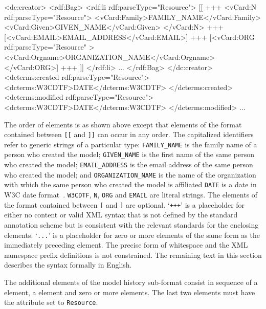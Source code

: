 \begin{blockChanged}

\begin{example}
<dc:creator>
  <rdf:Bag>
    <rdf:li rdf:parseType="Resource">
      [[
      +++
      <vCard:N rdf:parseType="Resource">
        <vCard:Family>FAMILY_NAME</vCard:Family>
        <vCard:Given>GIVEN_NAME</vCard:Given>
      </vCard:N>
      +++
      [<vCard:EMAIL>EMAIL_ADDRESS</vCard:EMAIL>]
      +++
      [<vCard:ORG rdf:parseType="Resource" >
        <vCard:Orgname>ORGANIZATION_NAME</vCard:Orgname>
      </vCard:ORG>]
      +++
      ]]
    </rdf:li>
    ...
  </rdf:Bag>
</dc:creator>
<dcterms:created rdf:parseType="Resource">
  <dcterms:W3CDTF>DATE</dcterms:W3CDTF>
</dcterms:created>
<dcterms:modified rdf:parseType="Resource">
  <dcterms:W3CDTF>DATE</dcterms:W3CDTF>
</dcterms:modified>
...
\end{example}
\end{blockChanged}

The order of elements is as shown above except that elements of
the format contained between \texttt{[[} and \texttt{]]} can occur
in any order.  The capitalized identifiers refer to generic
strings of a particular type: \texttt{FAMILY\_NAME} is the family
name of a person who created the model; \texttt{GIVEN\_NAME} is
the first name of the same person who created the model;
\texttt{EMAIL\_ADDRESS} is the email address of the same person
who created the model; and \texttt{ORGANIZATION\_NAME} is the name
of the organization with which the same person who created the
model is affiliated \texttt{DATE} is a date in W3C date
format~\citep{wolf:1998}. \texttt{W3CDTF}, \texttt{N},
\texttt{ORG} and \texttt{EMAIL} are literal strings. The elements
of the format contained between \texttt{[} and \texttt{]} are
optional. `\texttt{+++}' is a placeholder for either no content or
valid XML syntax that is not defined by the standard annotation
scheme but is consistent with the relevant standards for the
enclosing elements. `\texttt{...}' is a placeholder for zero or
more elements of the same form as the immediately preceding
element. The precise form of whitespace and the XML namespace
prefix definitions is not constrained.  The remaining text in this
section describes the syntax formally in English.

The additional elements of the model history sub-format consist in
sequence of a  element, a
 element and zero or more
 elements.  The last two elements must have
the attribute  set to \texttt{Resource}.

